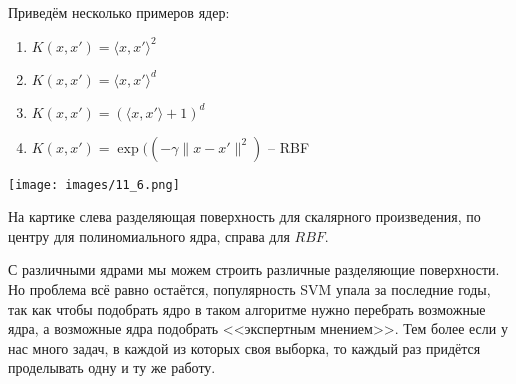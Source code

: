 \begin{example}
Приведём несколько примеров ядер:

\begin{enumerate}
    \item $K(x, x') = \langle x, x' \rangle^2$
    \item $K(x, x') = \langle x, x' \rangle^d$
    \item $K(x, x') = (\langle x, x' \rangle + 1)^d$
    \item $K(x, x') = \exp((-\gamma\|x - x'\|^2)$ -- RBF
\end{enumerate}
\end{example}

\begin{center}
    \texttt{[image: images/11\_6.png]}
\end{center}

На картике слева разделяющая поверхность для скалярного произведения, по центру для полиномиального ядра, справа для $RBF$.

С различными ядрами мы можем строить различные разделяющие поверхности. Но проблема всё равно остаётся, популярность SVM упала за последние годы, так как чтобы подобрать ядро в таком алгоритме нужно перебрать возможные ядра, а возможные ядра подобрать <<экспертным мнением>>. Тем более если у нас много задач, в каждой из которых своя выборка, то каждый раз придётся проделывать одну и ту же работу. 

